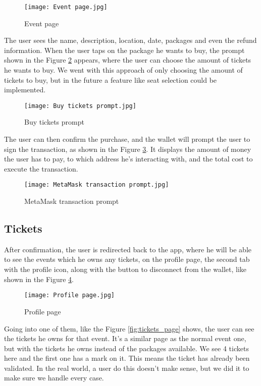 \begin{figure}[H]
	\texttt{[image: Event page.jpg]}
	\centering
	\caption{Event page}
	\label{fig:event_page}
\end{figure}

The user sees the name, description, location, date, packages and even the
refund information. When the user taps on the package he wants to buy, the
prompt shown in the Figure \ref{fig:buy_tickets_prompt} appears, where the user
can choose the amount of tickets he wants to buy. We went with this approach of
only choosing the amount of tickets to buy, but in the future a feature like
seat selection could be implemented.

\begin{figure}[H]
	\texttt{[image: Buy tickets prompt.jpg]}
	\centering
	\caption{Buy tickets prompt}
	\label{fig:buy_tickets_prompt}
\end{figure}

The user can then confirm the purchase, and the wallet will prompt the user to
sign the transaction, as shown in the Figure
\ref{fig:metamask_transaction_prompt}. It displays the amount of money the user
has to pay, to which address he's interacting with, and the total cost to
execute the transaction.

\begin{figure}[H]
	\texttt{[image: MetaMask transaction prompt.jpg]}
	\centering
	\caption{MetaMask transaction prompt}
	\label{fig:metamask_transaction_prompt}
\end{figure}

\subsection{Tickets}
\label{subsec:tickets}

After confirmation, the user is redirected back to the app, where he will be
able to see the events which he owns any tickets, on the profile page, the
second tab with the profile icon, along with the button to disconnect from the
wallet, like shown in the Figure \ref{fig:profile_page}.

\begin{figure}[H]
	\texttt{[image: Profile page.jpg]}
	\centering
	\caption{Profile page}
	\label{fig:profile_page}
\end{figure}

Going into one of them, like the Figure \ref{fig:tickets_page} shows, the user
can see the tickets he owns for that event. It's a similar page as the normal
event one, but with the tickets he owns instead of the packages available. We
see 4 tickets here and the first one has a mark on it. This means the ticket
has already been validated. In the real world, a user do this doesn't make
sense, but we did it to make sure we handle every case.

